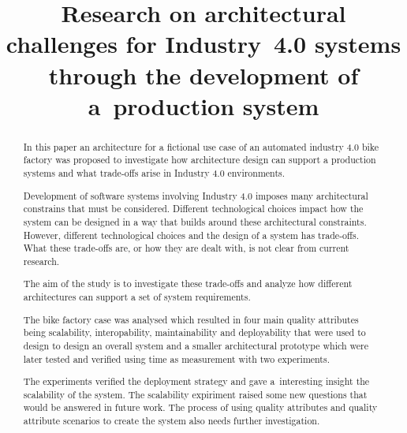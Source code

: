 \documentclass[conference]{IEEEtran}
\begin{document}
      
\title{Research on architectural challenges for Industry~4.0 systems through the development of a~production system\\
}

\author{
}



\maketitle
\IEEEpubidadjcol
\begin{abstract}

In this paper an architecture for a fictional use case of an automated industry 4.0 bike factory was proposed to investigate how architecture design can support a production systems and what trade-offs arise in Industry 4.0 environments.

Development of software systems involving Industry 4.0 imposes many architectural constrains that must be considered. Different technological choices impact how the system can be designed in a way that builds around these architectural constraints. However, different technological choices and the design of a system has trade-offs. What these trade-offs are, or how they are dealt with, is not clear from current research.  

The aim of the study is to investigate these trade-offs and analyze how different architectures can support a set of system requirements.

The bike factory case was analysed which resulted in four main quality attributes being scalability, interopability, maintainability and deployability that were used to design to design an overall system and a smaller architectural prototype which were later tested and verified using time as measurement with two experiments.
 
The experiments verified the deployment strategy and gave a~interesting insight the scalability of the system. The scalability expiriment raised some new questions that would be answered in future work. The process of using quality attributes and quality attribute scenarios to create the system also needs further investigation.

\end{abstract}
\end{document}
